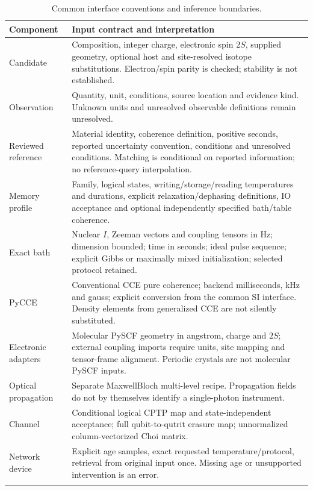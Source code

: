 \documentclass[10pt,a4paper]{article}
\begin{document}
{\small
\begin{longtable}{p{.26\linewidth}p{.65\linewidth}}
\toprule Component & Input contract and interpretation\\\midrule\endhead
Candidate & Composition, integer charge, electronic spin $2S$, supplied geometry, optional host and site-resolved isotope substitutions. Electron/spin parity is checked; stability is not established.\\
Observation & Quantity, unit, conditions, source location and evidence kind. Unknown units and unresolved observable definitions remain unresolved.\\
Reviewed reference & Material identity, coherence definition, positive seconds, reported uncertainty convention, conditions and unresolved conditions. Matching is conditional on reported information; no reference-query interpolation.\\
Memory profile & Family, logical states, writing/storage/reading temperatures and durations, explicit relaxation/dephasing definitions, IO acceptance and optional independently specified bath/table coherence.\\
Exact bath & Nuclear $I$, Zeeman vectors and coupling tensors in Hz; dimension bounded; time in seconds; ideal pulse sequence; explicit Gibbs or maximally mixed initialization; selected protocol retained.\\
PyCCE & Conventional CCE pure coherence; backend milliseconds, kHz and gauss; explicit conversion from the common SI interface. Density elements from generalized CCE are not silently substituted.\\
Electronic adapters & Molecular PySCF geometry in angstrom, charge and $2S$; external coupling imports require units, site mapping and tensor-frame alignment. Periodic crystals are not molecular PySCF inputs.\\
Optical propagation & Separate MaxwellBloch multi-level recipe. Propagation fields do not by themselves identify a single-photon instrument.\\
Channel & Conditional logical CPTP map and state-independent acceptance; full qubit-to-qutrit erasure map; unnormalized column-vectorized Choi matrix.\\
Network device & Explicit age samples, exact requested temperature/protocol, retrieval from original input once. Missing age or unsupported intervention is an error.\\
\bottomrule
\caption{Common interface conventions and inference boundaries.}
\end{longtable}
}
\end{document}
